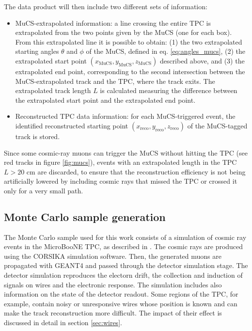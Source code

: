 \documentclass[a4paper,11pt]{article}
\begin{document}
The data product will then include two different sets of information:
\begin{itemize}
  \item MuCS-extrapolated information: a line crossing the entire TPC is extrapolated from the two points given by the MuCS (one for each box). From this extrapolated line it is possible to obtain: (1) the two extrapolated starting angles $\theta$ and $\phi$ of the MuCS, defined in eq. \eqref{eq:angles_mucs}, (2) the extrapolated start point $(x_{\mathrm{MuCS}},y_{\mathrm{MuCS}},z_{\mathrm{MuCS}})$ described above, and (3) the extrapolated end point, corresponding to the second intersection between the MuCS-extrapolated track and the TPC, where the track exits. The extrapolated track length $L$ is calculated measuring the difference between the extrapolated start point and the extrapolated end point.
  \item Reconstructed TPC data information: for each MuCS-triggered event, the identified reconstructed starting point $(x_{\mathrm{reco}},y_{\mathrm{reco}},z_{\mathrm{reco}})$ of the MuCS-tagged track is stored.
\end{itemize}

Since some cosmic-ray muons can trigger the MuCS without hitting the TPC (see red tracks in figure \ref{fig:mucs}), events with an extrapolated length in the TPC $L > 20$ cm are discarded, to ensure that the reconstruction efficiency is not being artificially lowered by including cosmic rays that missed the TPC or crossed it only for a very small path.

\subsection{Monte Carlo sample generation}\label{sec:mcgen}

The Monte Carlo sample used for this work consists of a simulation of cosmic ray events in the MicroBooNE TPC, as described in \cite{cosmic}. The cosmic rays are produced using the CORSIKA \cite{corsika} simulation software. Then, the generated muons are propagated with GEANT4 \cite{geant} and passed through the detector simulation stage. The detector simulation reproduces the electorn drift, the collection and induction of signals on wires and the electronic response. The simulation includes also information on the state of the detector readout. Some regions of the TPC, for example, contain noisy or unresponsive wires whose position is known and can make the track reconstruction more difficult. The impact of their effect is discussed in detail in section \ref{sec:wires}.
\end{document}

